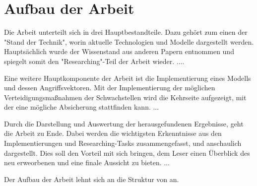 \section{Aufbau der Arbeit} \label{chpt:Einleitung_Aufbau_der_Arbeit}
Die Arbeit unterteilt sich in drei Hauptbestandteile. Dazu gehört zum einen der "Stand der Technik", worin aktuelle Technologien und Modelle dargestellt werden. Hauptsächlich wurde der Wissenstand aus anderen Papern entnommen und spiegelt somit den "Researching"-Teil der Arbeit wieder. ....

Eine weitere Hauptkomponente der Arbeit ist die Implementierung eines Modells und dessen Angriffsvektoren. Mit der Implementierung der möglichen Verteidigungsmaßnahmen der Schwachstellen wird die Kehrseite aufgezeigt, mit der eine mögliche Absicherung stattfinden kann. ...

Durch die Darstellung und Auswertung der herausgefundenen Ergebnisse, geht die Arbeit zu Ende. Dabei werden die wichtigsten Erkenntnisse aus den Implementierungen und Researching-Tasks zusammengefasst, und anschaulich dargestellt. Dies soll den Vorteil mit sich bringen, dem Leser einen Überblick des neu erweorbenen und eine finale Aussicht zu bieten. ...



Der Aufbau der Arbeit lehnt sich an die Struktur von \cite{Bar-Shalom} an.